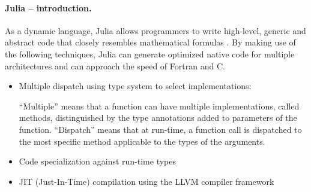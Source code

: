 \paragraph{Julia -- introduction.} 
As a dynamic language, Julia allows programmers to write high-level, generic and 
abstract code that closely resembles mathematical formulas 
\cite{bezanson2017julia, edelman2019julia}.
By making use of the following techniques, Julia can generate optimized native code for multiple architectures 
and can approach the speed of Fortran and C. \cite{Sengupta2019}
	\begin{itemize}
		\item Multiple dispatch using type system to select implementations: 
		
		``Multiple'' means that a function can have multiple implementations, called methods, distinguished by the type annotations added to parameters of the function. ``Dispatch'' means that at run-time, a function call is dispatched to the most specific method applicable to the types of the arguments.
		\item Code specialization against run-time types
		\item JIT (Just-In-Time) compilation using the LLVM compiler framework
	\end{itemize}


